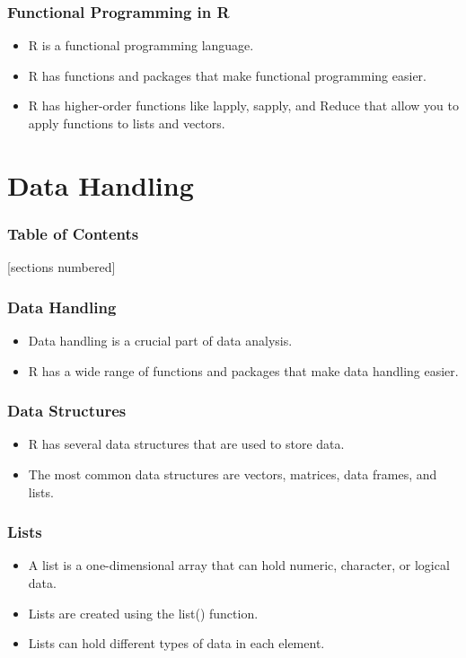 \documentclass[serif, 9pt, aspectratio=32]{beamer}
\begin{document}
\begin{frame}
    \centering
    \frametitle{Functional Programming in R}
    \begin{itemize}
        \setlength{\itemsep}{2em}
        \item R is a functional programming language.
        \item R has functions and packages that make functional programming easier.
        \item R has higher-order functions like lapply, sapply, and Reduce that allow you to apply functions to lists and vectors.
    \end{itemize}
\end{frame}

\section{Data Handling}

\begin{frame}
    \frametitle{Table of Contents}
    [sections numbered]
    \tableofcontents[currentsection]
\end{frame}

\begin{frame}
    \centering
    \frametitle{Data Handling}
    \begin{itemize}
        \setlength{\itemsep}{2em}
        \item Data handling is a crucial part of data analysis.
        \item R has a wide range of functions and packages that make data handling easier.
    \end{itemize}
\end{frame}

\begin{frame}
    \centering
    \frametitle{Data Structures}
    \begin{itemize}
        \setlength{\itemsep}{2em}
        \item R has several data structures that are used to store data.
        \item The most common data structures are vectors, matrices, data frames, and lists.
    \end{itemize}
\end{frame}

\begin{frame}
    \centering
    \frametitle{Lists}
    \begin{itemize}
        \setlength{\itemsep}{2em}
        \item A list is a one-dimensional array that can hold numeric, character, or logical data.
        \item Lists are created using the list() function.
        \item Lists can hold different types of data in each element.
    \end{itemize}
\end{frame}
\end{document}

